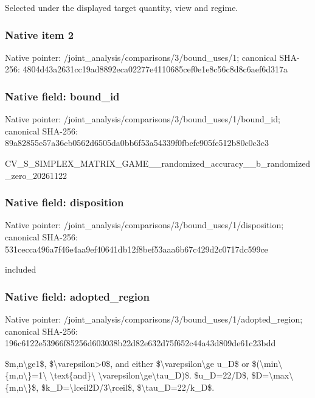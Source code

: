 \documentclass[10pt,a4paper]{article}
\begin{document}
Selected under the displayed target quantity, view and regime.


\subsubsection{Native item 2}


Native pointer: /joint\_analysis/comparis\allowbreak{}ons/3/bound\_uses/1; canonical SHA-256: 4804d43a2631cc19ad8892ec\allowbreak{}a02277e4110685cef0e1e8c5\allowbreak{}6c8d8c6aef6d317a



\subsubsection{Native field: bound\_id}


Native pointer: /joint\_analysis/comparis\allowbreak{}ons/3/bound\_uses/1/bound\allowbreak{}\_id; canonical SHA-256: 89a82855e57a36cb0562d650\allowbreak{}5da0bb6f53a54339f0fbefe9\allowbreak{}05fe512b80c0c3c3


CV\_S\_SIMPLEX\_MATRIX\_GAME\allowbreak{}\_\_randomized\_accuracy\_\_b\allowbreak{}\_randomized\_zero\_2026112\allowbreak{}2


\subsubsection{Native field: disposition}


Native pointer: /joint\_analysis/comparis\allowbreak{}ons/3/bound\_uses/1/dispo\allowbreak{}sition; canonical SHA-256: 531cecca496a7f46e4aa9ef4\allowbreak{}0641db12f8bef53aaa6b67c4\allowbreak{}29d2c0717dc599ce


included


\subsubsection{Native field: adopted\_region}


Native pointer: /joint\_analysis/comparis\allowbreak{}ons/3/bound\_uses/1/adopt\allowbreak{}ed\_region; canonical SHA-256: 196c6122e53966f85256d603\allowbreak{}038b22d82e632d75f652c44a\allowbreak{}43d809de61c23bdd


\$m,n\textbackslash{}ge1\$, \$\textbackslash{}varepsilon>0\$, and either \$\textbackslash{}varepsilon\textbackslash{}ge u\_D\$ or \$(\textbackslash{}min\textbackslash{}\{m,n\textbackslash{}\}=1\textbackslash{} \textbackslash{}text\{and\}\textbackslash{} \textbackslash{}varepsilon\textbackslash{}ge\textbackslash{}tau\_D)\$. \$u\_D=22/D\$, \$D=\textbackslash{}max\textbackslash{}\{m,n\textbackslash{}\}\$, \$k\_D=\textbackslash{}lceil2D/3\textbackslash{}rceil\$, \$\textbackslash{}tau\_D=22/k\_D\$.
\end{document}
